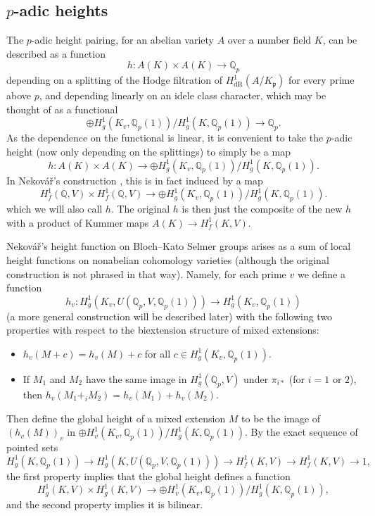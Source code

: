 \documentclass[11pt]{amsart}
\def\Q{\mathbb Q}
\theoremstyle{plain}
\theoremstyle{definition}
\DeclareMathOperator{\dR}{dR}
\begin{document}
\subsection{$p$-adic heights}
The $p$-adic height pairing, for an abelian variety $A$ over a number field $K$, can be described as a function
\[
h:A(K)\times A(K)\to \Q _p
\]
depending on a splitting of the Hodge filtration of $H^1 _{\dR}(A/K_{\mathfrak{p}})$ for every prime above $p$, and depending linearly on an idele class character, which may be thought of as a functional
\[
\oplus H^1 _g (K_v ,\Q _p (1))/H^1 _g (K ,\Q _p (1))\to \Q _p .
\]
As the dependence on the functional is linear, it is convenient to take the $p$-adic height (now only depending on the splittings) to simply be a map
\[
h:A(K)\times A(K)\to \oplus H^1 _g (K_v ,\Q _p (1))/H^1 _g (K ,\Q _p (1)) .
\]
In Nekov\'a\v r's construction \cite{nekovar}, this is in fact induced by a map
\[
H^1 _f (\Q ,V)\times H^1 _f (\Q ,V) \to \oplus  H^1 _g (K_v ,\Q _p (1))/H^1 _g (K ,\Q _p (1)) .
\]
which we will also call $h$. The original $h$ is then just the composite of the new $h$ with a product of Kummer maps $A(K)\to H^1 _f (K ,V)$. 

Nekov\'a\v r's height function on Bloch--Kato Selmer groups arises as a sum of local height functions on nonabelian cohomology varieties (although the original construction is not phrased in that way). Namely, for each prime $v$ we define a function
\[
h_v :H^1 _g (K_v ,U(\Q _p ,V,\Q _p (1)))\to H^1 _g (K _v ,\Q _p (1))
\]
(a more general construction will be described later) with the following two properties with respect to the biextension structure of mixed extensions:
\begin{itemize}
\item $h_v (M+c)=h_v (M)+c$ for all $c\in H^1 _g (K _v ,\Q _p (1))$.
\item If $M_1 $ and $M_2 $ have the same image in $H^1 _g (\Q _p ,V)$ under $\pi _{i*}$ (for $i=1$ or $2$), then $h_v (M_1 +_i M_2 )=h_v (M_1 )+h_v (M_2 )$.
\end{itemize}
Then define the global height of a mixed extension $M$ to be the image of $(h_v (M))_v $ in $\oplus H^1 _v (K _v ,\Q _p (1))/H^1 _g (K ,\Q _p (1))$. By the exact sequence of pointed sets
\[
H^1 _g (K ,\Q _p (1))\to H^1 _g (K,U(\Q _p ,V,\Q _p (1)))\to H^1 _f (K ,V)\to H^1 _f (K,V)\to 1,
\] 
the first property implies that the global height defines a function
\[
H^1 _g (K,V)\times H^1 _g (K ,V)\to \oplus H^1 _v (K _v ,\Q _p (1))/H^1 _g (K ,\Q _p (1)),
\]
and the second property implies it is bilinear.
\end{document}
